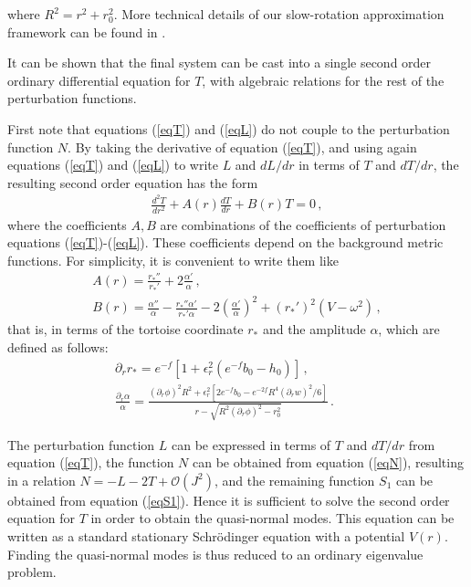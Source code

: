 \documentclass{article}
\begin{document}
\noindent 
where $R^2=r^2+r_0^2$.
More technical details of our slow-rotation approximation framework can be found in \cite{Blazquez-Salcedo:2022eik}.




%
It can be shown that the 
{final}
system can be cast into a single second order ordinary differential equation for $T$, with algebraic relations for the rest of the perturbation functions. 
%
%

First note that equations (\ref{eqT}) and (\ref{eqL}) do not couple to the perturbation function $N$. By taking the derivative of equation (\ref{eqT}), and using again equations (\ref{eqT}) and (\ref{eqL}) to write $L$ and $dL/dr$ in terms of $T$ and $dT/dr$, the resulting second order equation has the form
\begin{eqnarray}
\label{eqd2T}
\frac{d^2T}{dr^2}+ A(r)\frac{dT}{dr} + B(r)T = 0 \, ,
\end{eqnarray}
where the coefficients $A,B$ are combinations of the coefficients of perturbation equations 
(\ref{eqT})-(\ref{eqL}). 
These coefficients depend on the background metric functions. 
For simplicity, it is convenient to write them like
\begin{eqnarray}
    A(r) = \frac{r_*'' }{r_*'}+2\frac{\alpha'}{\alpha} \, , \\
    B(r) = \frac{\alpha'' }{\alpha}-\frac{r_*''\alpha' }{r_*'\alpha}-2\left(\frac{\alpha'}{\alpha}\right)^2+(r_*' )^2 (V-\omega^2)  \, ,
\end{eqnarray}
that is, in terms of the tortoise coordinate $r_*$ and the amplitude $\alpha$, which are defined as follows:
%
\begin{eqnarray}
\label{tor_coord}
%
   \partial_r r_*
   = e^{-f}
   \left[
   1 +
%
   \epsilon_r^2 (e^{-f}b_0-h_0)
   \right] \, ,   \, \, \, \, \, \, \, \, \, \, \, \,  \\
%
   \frac{\partial_r\alpha}{\alpha}
%
   = \frac{(\partial_r\phi)^2R^2
   +\epsilon_r^2
   [
   2e^{-f}b_0
%
   -
%
   e^{-2f}R^4(\partial_r w)^2/6
   ]
%
   }{r-\sqrt{R^2(\partial_r\phi)^2-r_0^2}}
%
   \, .  \, \, \, \, \, \, \, \, \, \, \, \, 
\end{eqnarray}


The perturbation function $L$ can be expressed in terms of $T$ and $dT/dr$ from equation (\ref{eqT}), the function $N$ can be obtained from equation (\ref{eqN}), resulting in a relation $N=-L-2T+\mathcal{O}(J^2)$, and the remaining  function $S_1$ can be obtained from equation (\ref{eqS1}). Hence it is sufficient to solve the second order equation for $T$ in order to obtain the quasi-normal modes.
This equation can be written as a standard stationary Schrödinger equation with a potential $V(r)$. Finding the quasi-normal modes is 
thus reduced to an ordinary eigenvalue problem. 
%
\end{document}
